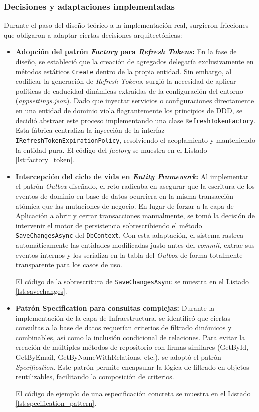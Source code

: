 \subsubsection{Decisiones y adaptaciones implementadas}
Durante el paso del diseño teórico a la implementación real, surgieron fricciones que obligaron a adaptar ciertas decisiones arquitectónicas:
\begin{itemize}
    \item \textbf{Adopción del patrón \emph{Factory} para \emph{Refresh Tokens}:} En la fase de diseño, se estableció que la creación de agregados delegaría exclusivamente en métodos estáticos \texttt{Create} dentro de la propia entidad. Sin embargo, al codificar la generación de \emph{Refresh Tokens}, surgió la necesidad de aplicar políticas de caducidad dinámicas extraídas de la configuración del entorno (\emph{appsettings.json}). Dado que inyectar servicios o configuraciones directamente en una entidad de dominio viola flagrantemente los principios de \ac{DDD}, se decidió abstraer este proceso implementando una clase \texttt{RefreshTokenFactory}. Esta fábrica centraliza la inyección de la interfaz \texttt{IRefreshTokenExpirationPolicy}, resolviendo el acoplamiento y manteniendo la entidad pura.
    El código del \emph{factory} se muestra en el Listado \ref{lst:factory_token}.
    
    
    
    \item \textbf{Intercepción del ciclo de vida en \emph{Entity Framework}:} Al implementar el patrón \emph{Outbox} diseñado, el reto radicaba en asegurar que la escritura de los eventos de dominio en base de datos ocurriera en la misma transacción atómica que las mutaciones de negocio. En lugar de forzar a la capa de Aplicación a abrir y cerrar transacciones manualmente, se tomó la decisión de intervenir el motor de persistencia sobrescribiendo el método \texttt{SaveChangesAsync} del \texttt{DbContext}. Con esta adaptación, el sistema rastrea automáticamente las entidades modificadas justo antes del \emph{commit}, extrae sus eventos internos y los serializa en la tabla del \emph{Outbox} de forma totalmente transparente para los casos de uso.
    
    El código de la sobrescritura de \texttt{SaveChangesAsync} se muestra en el Listado \ref{lst:savechanges}.

    \item \textbf{Patrón Specification para consultas complejas:} Durante la implementación de la capa de Infraestructura, se identificó que ciertas consultas a la base de datos requerían criterios de filtrado dinámicos y combinables, así como la inclusión condicional de relaciones. Para evitar la creación de múltiples métodos de repositorio con firmas similares (GetById, GetByEmail, GetByNameWithRelations, etc.), se adoptó el patrón \emph{Specification}. Este patrón permite encapsular la lógica de filtrado en objetos reutilizables, facilitando la composición de criterios.
    
    El código de ejemplo de una especificación concreta se muestra en el Listado \ref{lst:specification_pattern}.

\end{itemize}

